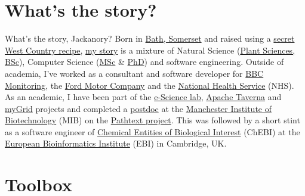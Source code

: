 \documentclass[
  12pt,
]{book}
\begin{document}
\hypertarget{whats-the-story}{%
\section*{What's the story?}\label{whats-the-story}}

What's the story, Jackanory? Born in \href{https://en.wikipedia.org/wiki/Bath,_Somerset}{Bath, Somerset} and raised using a \href{https://en.wikipedia.org/wiki/West_Country}{secret West Country recipe}, \href{https://uk.linkedin.com/in/duncanhull}{my story} is a mixture of Natural Science (\href{https://speakerdeck.com/dullhunk/why-study-plants}{Plant Sciences, BSc}), Computer Science (\href{mastersofscience.html}{MSc} \& \href{https://ethos.bl.uk/OrderDetails.do?uin=uk.bl.ethos.497578}{PhD}) and software engineering. Outside of academia, I've worked as a consultant and software developer for \href{https://en.wikipedia.org/wiki/BBC_Monitoring}{BBC Monitoring}, the \href{https://en.wikipedia.org/wiki/Ford_Motor_Company}{Ford Motor Company} and the \href{https://en.wikipedia.org/wiki/National_Health_Service}{National Health Service} (NHS). As an academic, I have been part of the \href{https://esciencelab.org.uk/}{e-Science lab}, \href{https://en.wikipedia.org/wiki/Apache_Taverna}{Apache Taverna} and \href{https://en.wikipedia.org/wiki/MyGrid}{myGrid} projects and completed a \href{https://en.wikipedia.org/wiki/Postdoctoral_researcher}{postdoc} at the \href{https://www.mib.manchester.ac.uk/}{Manchester Institute of Biotechnology} (MIB) on the \href{https://pubmed.ncbi.nlm.nih.gov/20529930/}{Pathtext project}. This was followed by a short stint as a software engineer of \href{https://en.wikipedia.org/wiki/ChEBI}{Chemical Entities of Biological Interest} (ChEBI) at the \href{https://en.wikipedia.org/wiki/European_Bioinformatics_Institute}{European Bioinformatics Institute} (EBI) in Cambridge, UK. 🧬👨‍🔬

\hypertarget{toolbox}{%
\section*{Toolbox}\label{toolbox}}
\end{document}
